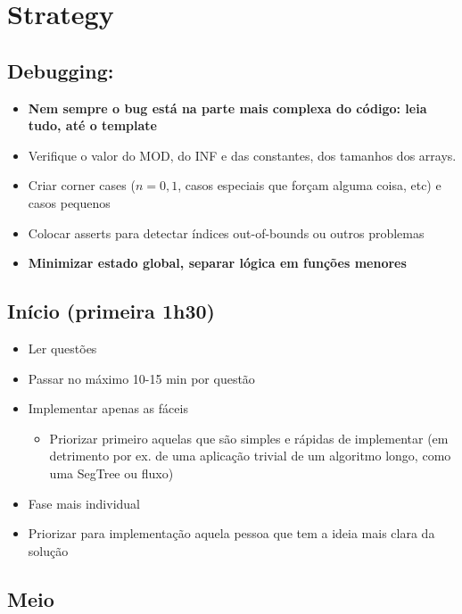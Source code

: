 \pagebreak

\section{Strategy}

\subsection{Debugging:}

\begin{itemize}
	\item \textbf{Nem sempre o bug está na parte mais complexa do código: leia tudo, até o template}
	\item Verifique o valor do MOD, do INF e das constantes, dos tamanhos dos arrays.
	\item Criar corner cases ($n=0,1$, casos especiais que forçam alguma coisa, etc) e casos pequenos
	\item Colocar asserts para detectar índices out-of-bounds ou outros problemas
	\item \textbf{Minimizar estado global, separar lógica em funções menores}
\end{itemize}

\subsection{Início (primeira 1h30)}

\begin{itemize}
	\item Ler questões
	\item Passar no máximo 10-15 min por questão
	\item Implementar apenas as fáceis
	\begin{itemize}
		\item Priorizar primeiro aquelas que são simples e rápidas de implementar
		(em detrimento por ex. de uma aplicação trivial de um algoritmo longo, como uma SegTree ou fluxo)
	\end{itemize}
	\item Fase mais individual
	\item Priorizar para implementação aquela pessoa que tem a ideia mais clara da solução
\end{itemize}

\subsection{Meio}

